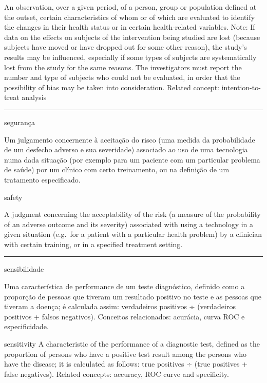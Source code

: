 \documentclass[
  openany]{book}
\begin{document}
An observation, over a given period, of a person, group or population defined at the outset, certain characteristics of whom or of which are evaluated to identify the changes in their health status or in certain health-related variables. Note: If data on the effects on subjects of the intervention being studied are lost (because subjects have moved or have dropped out for some other reason), the study's results may be influenced, especially if some types of subjects are systematically lost from the study for the same reasons. The investigators must report the number and type of subjects who could not be evaluated, in order that the possibility of bias may be taken into consideration. Related concept: intention-to-treat analysis

\begin{center}\rule{0.5\linewidth}{0.5pt}\end{center}

segurança

Um julgamento concernente à aceitação do risco (uma medida da probabilidade de um desfecho adverso e sua severidade) associado ao uso de uma tecnologia numa dada situação (por exemplo para um paciente com um particular problema de saúde) por um clínico com certo treinamento, ou na definição de um tratamento especificado.

safety

A judgment concerning the acceptability of the risk (a measure of the probability of an adverse outcome and its severity) associated with using a technology in a given situation (e.g.~for a patient with a particular health problem) by a clinician with certain training, or in a specified treatment setting.

\begin{center}\rule{0.5\linewidth}{0.5pt}\end{center}

sensibilidade

Uma característica de performance de um teste diagnóstico, definido como a proporção de pessoas que tiveram um resultado positivo no teste e as pessoas que tiveram a doença; é calculada assim: verdadeiros positivos ÷ (verdadeiros positivos + falsos negativos). Conceitos relacionados: acurácia, curva ROC e especificidade.

sensitivity
A characteristic of the performance of a diagnostic test, defined as the proportion of persons who have a positive test result among the persons who have the disease; it is calculated as follows: true positives ÷ (true positives + false negatives). Related concepts: accuracy, ROC curve and specificity.
\end{document}
